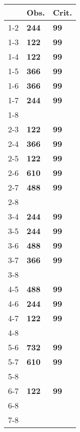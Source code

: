 \begin{table}[ht]
\centering
\begin{tabular}{rll}
  \hline
 & Obs. & Crit. \\ 
  \hline
1-2 & \textbf{244} & \textbf{99} \\ 
  1-3 & \textbf{122} & \textbf{99} \\ 
  1-4 & \textbf{122} & \textbf{99} \\ 
  1-5 & \textbf{366} & \textbf{99} \\ 
  1-6 & \textbf{366} & \textbf{99} \\ 
  1-7 & \textbf{244} & \textbf{99} \\ 
  1-8 &  &  \\ 
  2-3 & \textbf{122} & \textbf{99} \\ 
  2-4 & \textbf{366} & \textbf{99} \\ 
  2-5 & \textbf{122} & \textbf{99} \\ 
  2-6 & \textbf{610} & \textbf{99} \\ 
  2-7 & \textbf{488} & \textbf{99} \\ 
  2-8 &  &  \\ 
  3-4 & \textbf{244} & \textbf{99} \\ 
  3-5 & \textbf{244} & \textbf{99} \\ 
  3-6 & \textbf{488} & \textbf{99} \\ 
  3-7 & \textbf{366} & \textbf{99} \\ 
  3-8 &  &  \\ 
  4-5 & \textbf{488} & \textbf{99} \\ 
  4-6 & \textbf{244} & \textbf{99} \\ 
  4-7 & \textbf{122} & \textbf{99} \\ 
  4-8 &  &  \\ 
  5-6 & \textbf{732} & \textbf{99} \\ 
  5-7 & \textbf{610} & \textbf{99} \\ 
  5-8 &  &  \\ 
  6-7 & \textbf{122} & \textbf{99} \\ 
  6-8 &  &  \\ 
  7-8 &  &  \\ 
   \hline
\end{tabular}
\end{table}
